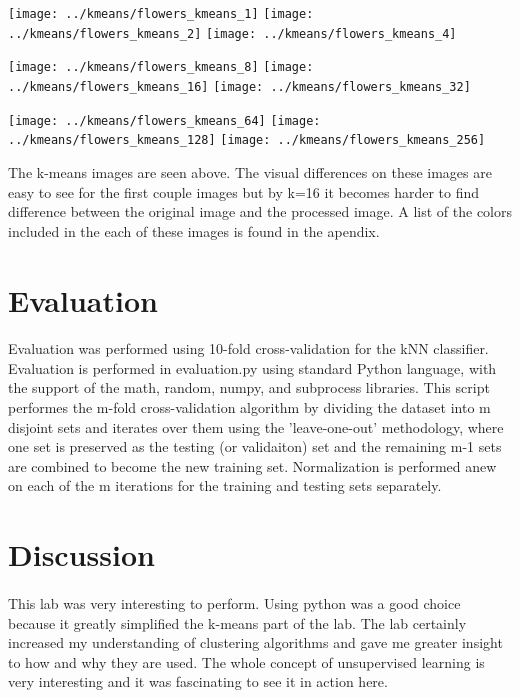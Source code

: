 \documentclass{article}
\begin{document}
\newpage
\centerline{
\texttt{[image: ../kmeans/flowers\_kmeans\_1]}
\texttt{[image: ../kmeans/flowers\_kmeans\_2]}
\texttt{[image: ../kmeans/flowers\_kmeans\_4]}}
\centerline{
\texttt{[image: ../kmeans/flowers\_kmeans\_8]}
\texttt{[image: ../kmeans/flowers\_kmeans\_16]}
\texttt{[image: ../kmeans/flowers\_kmeans\_32]}}
\centerline{
\texttt{[image: ../kmeans/flowers\_kmeans\_64]}
\texttt{[image: ../kmeans/flowers\_kmeans\_128]}
\texttt{[image: ../kmeans/flowers\_kmeans\_256]}}
The k-means images are seen above. The visual differences on these images are 
easy to see for the first couple images but by k=16 it becomes harder to find 
difference between the original image and the processed image. A list of the 
colors included in the each of these images is found in the apendix.
\newpage


\section*{Evaluation}
\paragraph{}
Evaluation was performed using 10-fold cross-validation for the kNN classifier.
Evaluation is performed in evaluation.py using standard Python language, with the support of
the math, random, numpy, and subprocess libraries.  This script performes the m-fold
cross-validation algorithm by dividing the dataset into m disjoint sets and iterates over them
using the 'leave-one-out' methodology, where one set is preserved as the testing (or validaiton)
set and the remaining m-1 sets are combined to become the new training set.  Normalization is
performed anew on each of the m iterations for the training and testing sets separately.


\section*{Discussion}
\paragraph{}
This lab was very interesting to perform. Using python was a good
choice because it greatly simplified the k-means part of the lab.
The lab certainly increased my understanding of clustering algorithms 
and gave me greater insight to how and why they are used. The whole
concept of unsupervised learning is very interesting and it was fascinating
to see it in action here.
\newpage
\end{document}
